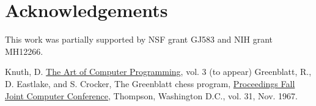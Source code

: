\documentclass{article}
\begin{document}
\section*{Acknowledgements}

This work was partially supported by NSF grant GJ583 and NIH grant MH12266.

\begin{thebibliography}{9}
Knuth, D. \underline{The Art of Computer Programming}, vol. 3 (to appear)
Greenblatt, R., D. Eastlake, and S. Crocker, The Greenblatt chess program, \underline{Proceedings Fall Joint Computer Conference}, Thompson, Washington D.C., vol. 31, Nov. 1967.
\end{thebibliography}
\end{document}

